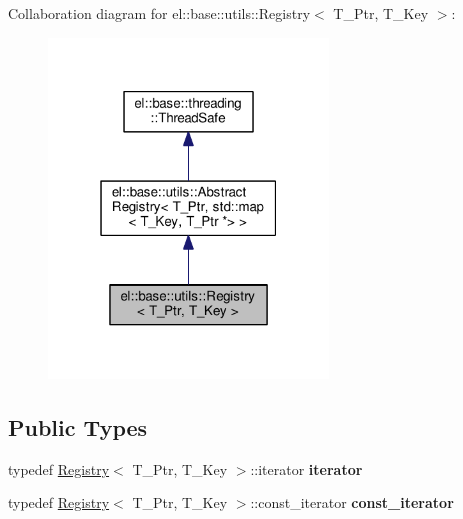 Collaboration diagram for el\+:\+:base\+:\+:utils\+:\+:Registry$<$ T\+\_\+\+Ptr, T\+\_\+\+Key $>$\+:
\nopagebreak
\begin{figure}[H]
\begin{center}
\leavevmode
\includegraphics[width=211pt]{classel_1_1base_1_1utils_1_1_registry__coll__graph}
\end{center}
\end{figure}
\subsection*{Public Types}
\begin{DoxyCompactItemize}
\item 
\mbox{\label{classel_1_1base_1_1utils_1_1_registry_a31f3d725285e6b65f1f9e990066f96ed}} 
typedef \hyperlink{classel_1_1base_1_1utils_1_1_registry}{Registry}$<$ T\+\_\+\+Ptr, T\+\_\+\+Key $>$\+::iterator {\bfseries iterator}
\item 
\mbox{\label{classel_1_1base_1_1utils_1_1_registry_a955e62adc74c60d0205b52a3fc430cef}} 
typedef \hyperlink{classel_1_1base_1_1utils_1_1_registry}{Registry}$<$ T\+\_\+\+Ptr, T\+\_\+\+Key $>$\+::const\+\_\+iterator {\bfseries const\+\_\+iterator}
\end{DoxyCompactItemize}
